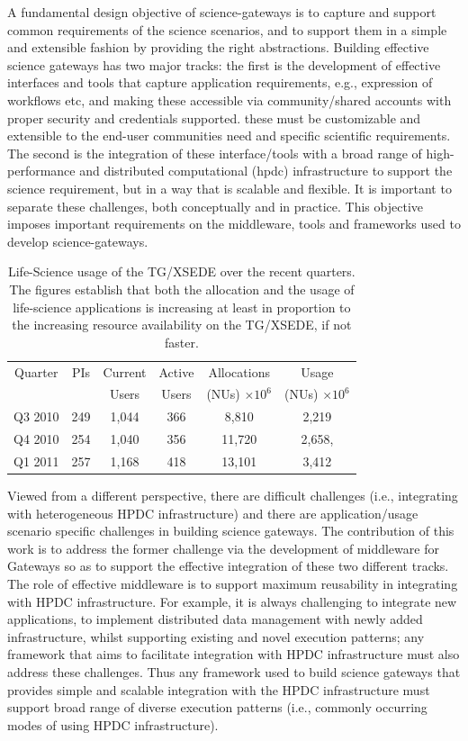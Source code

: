\documentclass[]{svjour3}
\begin{document}
A fundamental design objective of science-gateways is to capture and
support common requirements of the science scenarios, and to support
them in a simple and extensible fashion by providing the right
abstractions.  Building effective science gateways has two major
tracks: the first is the development of effective interfaces and tools
that capture application requirements, e.g., expression of workflows
etc, and making these accessible via community/shared accounts with
proper security and credentials supported. these must be customizable
and extensible to the end-user communities need and specific
scientific requirements. The second is the integration of these
interface/tools with a broad range of high-performance and distributed
computational (hpdc) infrastructure to support the science
requirement, but in a way that is scalable and flexible.  It is
important to separate these challenges, both conceptually and in
practice.  This objective imposes important requirements on the
middleware, tools and frameworks used to develop science-gateways.


\begin{table}
\centering
 \small
\begin{tabular}{|c|c|c|c|c|c|} 
  \hline  Quarter & PIs & Current & Active & Allocations  & Usage\\
  & & Users  &  Users & (NUs) $\times 10^6$& (NUs) $\times 10^6$ \\ \hline
  Q3 2010 & 249 & 1,044 & 366 & 8,810   & 2,219  \\ \hline
  Q4 2010 & 254 & 1,040 & 356 & 11,720  & 2,658, \\ \hline
  Q1 2011 & 257 & 1,168 & 418 & 13,101  & 3,412\\ \hline 
\end{tabular} 
\caption{Life-Science usage of the TG/XSEDE over the recent
  quarters. The figures establish that both the  allocation and the
  usage of life-science applications is increasing at least in
  proportion to the increasing resource availability on the TG/XSEDE,
  if not faster.}
 \label{tg2011} 
\end{table}

Viewed from a different perspective, there are difficult challenges
(i.e., integrating with heterogeneous HPDC infrastructure) and there
are application/usage scenario specific challenges in building science
gateways. The contribution of this work is to address the former
challenge via the development of middleware for Gateways so as to
support the effective integration of these two different tracks.  The
role of effective middleware is to support maximum reusability in
integrating with HPDC infrastructure. For example, it is always
challenging to integrate new applications, to implement distributed
data management with newly added infrastructure, whilst supporting
existing and novel execution patterns; any framework that aims to
facilitate integration with HPDC infrastructure must also address
these challenges.  Thus any framework used to build science gateways
that provides simple and scalable integration with the HPDC
infrastructure must support broad range of diverse execution patterns
(i.e., commonly occurring modes of using HPDC infrastructure).
\end{document}
